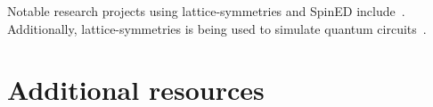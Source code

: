 Notable research projects using lattice-symmetries and SpinED include~\cite{astrakhantsev2021,bagrov2020,westerhout2020}. Additionally, lattice-symmetries is being used to simulate quantum circuits~\cite{qsl2021}.

\section{Additional resources}

